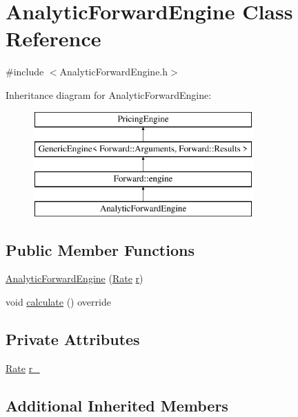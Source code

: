 \hypertarget{class_analytic_forward_engine}{}\section{Analytic\+Forward\+Engine Class Reference}
\label{class_analytic_forward_engine}


{\ttfamily \#include $<$Analytic\+Forward\+Engine.\+h$>$}

Inheritance diagram for Analytic\+Forward\+Engine\+:\begin{figure}[H]
\begin{center}
\leavevmode
\includegraphics[height=4.000000cm]{class_analytic_forward_engine}
\end{center}
\end{figure}
\subsection*{Public Member Functions}
\begin{DoxyCompactItemize}
\item 
\hyperlink{class_analytic_forward_engine_a7745431773dc2910c8aa01183b7780d0}{Analytic\+Forward\+Engine} (\hyperlink{_name_def_8h_a25bee43a162de339c81f3d1caf6b887d}{Rate} \hyperlink{_uniform_l_ecuyer_r_n_g1_8cpp_a372556d73d7e403d9b677b89b21ee572}{r})
\item 
void \hyperlink{class_analytic_forward_engine_a12d6791a13bf727d43ffcff9cb55b094}{calculate} () override
\end{DoxyCompactItemize}
\subsection*{Private Attributes}
\begin{DoxyCompactItemize}
\item 
\hyperlink{_name_def_8h_a25bee43a162de339c81f3d1caf6b887d}{Rate} \hyperlink{class_analytic_forward_engine_a4398f98b358ec1800db1e8e609b45321}{r\+\_\+}
\end{DoxyCompactItemize}
\subsection*{Additional Inherited Members}


